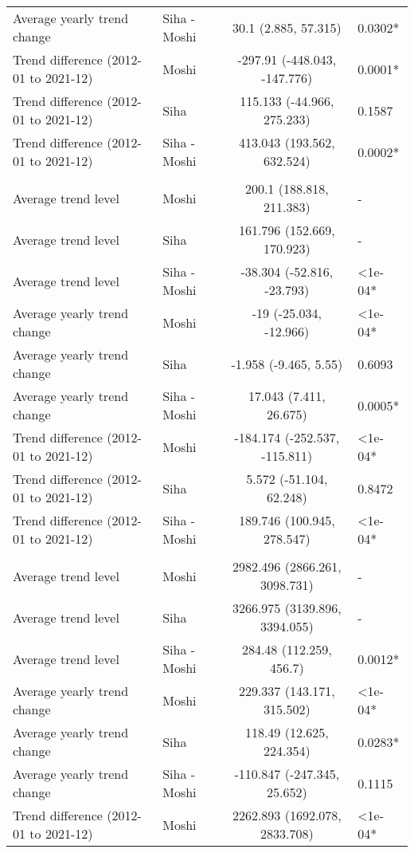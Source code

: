 \begin{longtable}{l|lcl}
Average yearly trend change & Siha - Moshi & 30.1 (2.885, 57.315) & 0.0302* \\ 
Trend difference (2012-01 to 2021-12) & Moshi & -297.91 (-448.043, -147.776) & 0.0001* \\ 
Trend difference (2012-01 to 2021-12) & Siha & 115.133 (-44.966, 275.233) & 0.1587 \\ 
Trend difference (2012-01 to 2021-12) & Siha - Moshi & 413.043 (193.562, 632.524) & 0.0002* \\ 
\midrule\addlinespace[2.5pt]
\multicolumn{4}{l}{Respiratory Diseases} \\[2.5pt] 
\midrule\addlinespace[2.5pt]
Average trend level & Moshi & 200.1 (188.818, 211.383) & - \\ 
Average trend level & Siha & 161.796 (152.669, 170.923) & - \\ 
Average trend level & Siha - Moshi & -38.304 (-52.816, -23.793) & <1e-04* \\ 
Average yearly trend change & Moshi & -19 (-25.034, -12.966) & <1e-04* \\ 
Average yearly trend change & Siha & -1.958 (-9.465, 5.55) & 0.6093 \\ 
Average yearly trend change & Siha - Moshi & 17.043 (7.411, 26.675) & 0.0005* \\ 
Trend difference (2012-01 to 2021-12) & Moshi & -184.174 (-252.537, -115.811) & <1e-04* \\ 
Trend difference (2012-01 to 2021-12) & Siha & 5.572 (-51.104, 62.248) & 0.8472 \\ 
Trend difference (2012-01 to 2021-12) & Siha - Moshi & 189.746 (100.945, 278.547) & <1e-04* \\ 
\midrule\addlinespace[2.5pt]
\multicolumn{4}{l}{Respiratory Infections} \\[2.5pt] 
\midrule\addlinespace[2.5pt]
Average trend level & Moshi & 2982.496 (2866.261, 3098.731) & - \\ 
Average trend level & Siha & 3266.975 (3139.896, 3394.055) & - \\ 
Average trend level & Siha - Moshi & 284.48 (112.259, 456.7) & 0.0012* \\ 
Average yearly trend change & Moshi & 229.337 (143.171, 315.502) & <1e-04* \\ 
Average yearly trend change & Siha & 118.49 (12.625, 224.354) & 0.0283* \\ 
Average yearly trend change & Siha - Moshi & -110.847 (-247.345, 25.652) & 0.1115 \\ 
Trend difference (2012-01 to 2021-12) & Moshi & 2262.893 (1692.078, 2833.708) & <1e-04* \\ 

\end{longtable}
